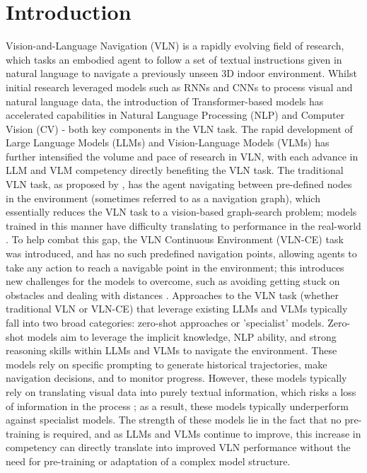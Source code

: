 \documentclass{svproc}
\begin{document}
\section{Introduction}
    Vision-and-Language Navigation (VLN) is a rapidly evolving field of research, which tasks an embodied agent to follow a set of textual instructions given in natural language to navigate a previously unseen 3D indoor environment. Whilst initial research leveraged models such as RNNs and CNNs to process visual and natural language data, the introduction of Transformer-based models \cite{attenion_is_all_you_need} has accelerated capabilities in Natural Language Processing (NLP) and Computer Vision (CV) - both key components in the VLN task. The rapid development of Large Language Models (LLMs) and Vision-Language Models (VLMs) has further intensified the volume and pace of research in VLN, with each advance in LLM and VLM competency directly benefiting the VLN task.
    The traditional VLN task, as proposed by \cite{8578485}, has the agent navigating between pre-defined nodes in the environment (sometimes referred to as a navigation graph), which essentially reduces the VLN task to a vision-based graph-search problem; models trained in this manner have difficulty translating to performance in the real-world \cite{pmlr-v155-anderson21a}. To help combat this gap, the VLN Continuous Environment (VLN-CE) task was introduced, and has no such predefined navigation points, allowing agents to take any action to reach a navigable point in the environment; this introduces new challenges for the models to overcome, such as avoiding getting stuck on obstacles and dealing with distances \cite{krantz2020navgraphvisionandlanguagenavigationcontinuous}.
    \newline
    Approaches to the VLN task (whether traditional VLN or VLN-CE) that leverage existing LLMs and VLMs typically fall into two broad categories: zero-shot approaches or 'specialist' models.
    Zero-shot models \cite{long2023_discussnav, chen2024mapgptmapguidedpromptingadaptive, zhou2023navgptexplicitreasoningvisionandlanguage} aim to leverage the implicit knowledge, NLP ability, and strong reasoning skills within LLMs and VLMs \cite{CITATION_NEEDED} to navigate the environment. These models rely on specific prompting to generate historical trajectories, make navigation decisions, and to monitor progress. However, these models typically rely on translating visual data into purely textual information, which risks a loss of information in the process \cite{pan2024langnavlanguageperceptualrepresentation}; as a result, these models typically underperform against specialist models. The strength of these models lie in the fact that no pre-training is required, and as LLMs and VLMs continue to improve, this increase in competency can directly translate into improved VLN performance without the need for pre-training or adaptation of a complex model structure.
\end{document}
